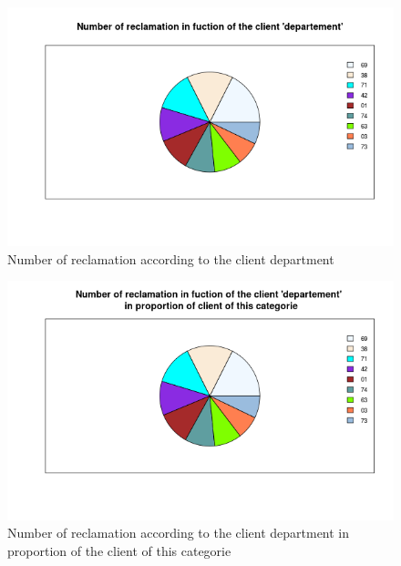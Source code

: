 \documentclass[a4paper, 11pt]{article}
\begin{document}
        \begin{figure}[!ht]
        	\centering
                \includegraphics[height = 10 cm]{Valentin/Number_of_reclamation_in_fuction_of_the_client_departement.png}
                \caption{Number of reclamation according to the client department}
                \label{fig:reclamtion_dep2}
        \end{figure}
        
        \begin{figure}[!ht]
        	\centering
                \includegraphics[height = 10 cm]{Valentin/Number_of_reclamation_in_fuction_of_the_client_departement_proportion.png}
                \caption{Number of reclamation according to the client department in proportion of the client of this categorie}
                \label{fig:reclamtion_dep3}
        \end{figure}
        
\end{document}
